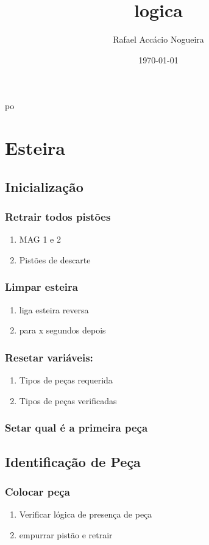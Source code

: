 \documentclass[11pt]{article}
\author{Rafael Accácio Nogueira}
\date{\today}
\title{logica}
\begin{document}
\maketitle
\tableofcontents

po\newpage
\section{Esteira}
\label{sec-1}
\subsection{Inicialização}
\label{sec-1-1}
\subsubsection{Retrair todos pistões}
\label{sec-1-1-1}
\begin{enumerate}
\item MAG 1 e 2
\item Pistões de descarte
\end{enumerate}
\subsubsection{Limpar esteira}
\label{sec-1-1-2}
\begin{enumerate}
\item liga esteira reversa
\item para x segundos depois
\end{enumerate}
\subsubsection{Resetar variáveis:}
\label{sec-1-1-3}
\begin{enumerate}
\item Tipos de peças requerida
\item Tipos de peças verificadas
\end{enumerate}
\subsubsection{Setar qual é a primeira peça}
\label{sec-1-1-4}
\subsection{Identificação de Peça}
\label{sec-1-2}
\subsubsection{Colocar peça}
\label{sec-1-2-1}
\begin{enumerate}
\item Verificar lógica de presença de peça
\item empurrar pistão e retrair
\end{enumerate}
\end{document}
